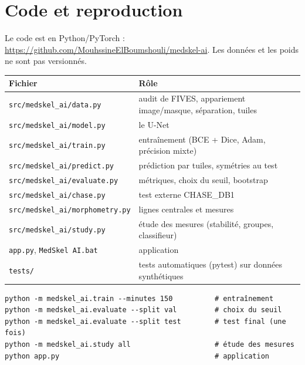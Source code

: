 \documentclass[11pt,a4paper]{article}
\begin{document}
\appendix
\section{Code et reproduction}
Le code est en Python/PyTorch : \url{https://github.com/MouhssineElBoumshouli/medskel-ai}. Les données et les poids ne sont pas versionnés.
\begin{center}\small
\begin{tabularx}{\textwidth}{@{}lX@{}}
\toprule
\textbf{Fichier} & \textbf{Rôle} \\
\midrule
\texttt{src/medskel\_ai/data.py} & audit de FIVES, appariement image/masque, séparation, tuiles \\
\texttt{src/medskel\_ai/model.py} & le U-Net \\
\texttt{src/medskel\_ai/train.py} & entraînement (BCE + Dice, Adam, précision mixte) \\
\texttt{src/medskel\_ai/predict.py} & prédiction par tuiles, symétries au test \\
\texttt{src/medskel\_ai/evaluate.py} & métriques, choix du seuil, bootstrap \\
\texttt{src/medskel\_ai/chase.py} & test externe CHASE\_DB1 \\
\texttt{src/medskel\_ai/morphometry.py} & lignes centrales et mesures \\
\texttt{src/medskel\_ai/study.py} & étude des mesures (stabilité, groupes, classifieur) \\
\texttt{app.py}, \texttt{MedSkel AI.bat} & application \\
\texttt{tests/} & tests automatiques (pytest) sur données synthétiques \\
\bottomrule
\end{tabularx}
\end{center}
\begin{verbatim}
python -m medskel_ai.train --minutes 150          # entraînement
python -m medskel_ai.evaluate --split val         # choix du seuil
python -m medskel_ai.evaluate --split test        # test final (une fois)
python -m medskel_ai.study all                    # étude des mesures
python app.py                                     # application
\end{verbatim}
\end{document}
